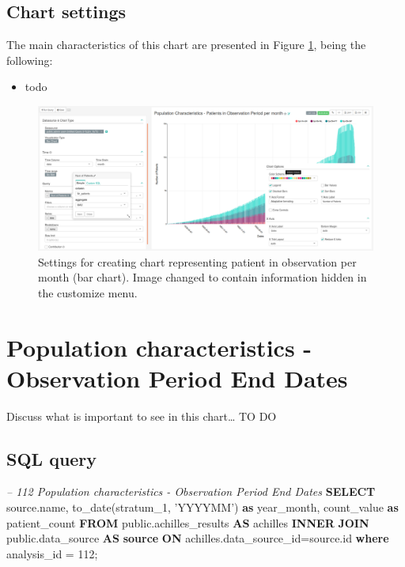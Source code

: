 \documentclass[]{book}
\newenvironment{Shaded}{\begin{snugshade}}{\end{snugshade}}
\newcommand{\KeywordTok}[1]{\textcolor[rgb]{0.13,0.29,0.53}{\textbf{#1}}}
\newcommand{\DecValTok}[1]{\textcolor[rgb]{0.00,0.00,0.81}{#1}}
\newcommand{\StringTok}[1]{\textcolor[rgb]{0.31,0.60,0.02}{#1}}
\newcommand{\CommentTok}[1]{\textcolor[rgb]{0.56,0.35,0.01}{\textit{#1}}}
\newcommand{\FunctionTok}[1]{\textcolor[rgb]{0.00,0.00,0.00}{#1}}
\newcommand{\NormalTok}[1]{#1}
\providecommand{\tightlist}{%
  \setlength{\itemsep}{0pt}\setlength{\parskip}{0pt}}
\begin{document}
\subsection{Chart settings}\label{chart-settings-10}

The main characteristics of this chart are presented in Figure
\ref{fig:populationCharacteristicsPatientsInObservationPeriodPerMonth},
being the following:

\begin{itemize}
\tightlist
\item
  todo
\end{itemize}

\begin{figure}
\includegraphics[width=1\linewidth]{images/populationCharacteristicsPatientsInObservationPeriodPerMonth} \caption{Settings for creating chart representing patient in observation per month (bar chart). Image changed to contain information hidden in the customize menu.}\label{fig:populationCharacteristicsPatientsInObservationPeriodPerMonth}
\end{figure}

\section{Population characteristics - Observation Period End
Dates}\label{population-characteristics---observation-period-end-dates}

Discuss what is important to see in this chart\ldots{} TO DO

\subsection{SQL query}\label{sql-query-11}

\begin{Shaded}
\begin{Highlighting}[]
\CommentTok{-- 112  Population characteristics - Observation Period End Dates}
\KeywordTok{SELECT}\NormalTok{ source.name,}
       \FunctionTok{to_date}\NormalTok{(stratum_1, }\StringTok{'YYYYMM'}\NormalTok{) }\KeywordTok{as}\NormalTok{ year_month,}
\NormalTok{       count_value }\KeywordTok{as}\NormalTok{ patient_count}
\KeywordTok{FROM}\NormalTok{ public.achilles_results }\KeywordTok{AS}\NormalTok{ achilles }\KeywordTok{INNER} \KeywordTok{JOIN} 
\NormalTok{    public.data_source }\KeywordTok{AS} \KeywordTok{source} \KeywordTok{ON}\NormalTok{ achilles.data_source_id=source.id}
\KeywordTok{where}\NormalTok{ analysis_id = }\DecValTok{112}\NormalTok{;}
\end{Highlighting}
\end{Shaded}
\end{document}
